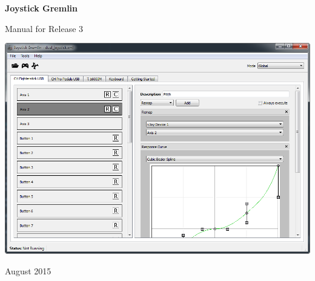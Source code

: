 \begin{titlepage}
\begin{center}
	\vspace*{\fill}
	\vspace*{-3cm}
    \begin{Huge}
        \textbf{Joystick Gremlin}
    \end{Huge}

    \vspace{1cm}

    \begin{Large}
        {Manual for Release 3}
    \end{Large}

    \vspace{3cm}

    \includegraphics[width=0.9\linewidth]{images/main_window_clean}

    \vspace{6.0cm}

	August 2015
\vspace*{\fill}
\end{center}
\end{titlepage}

